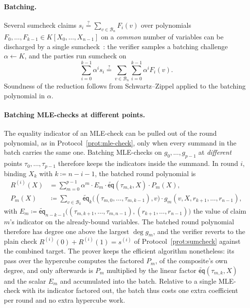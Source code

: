 \documentclass{article}
\theoremstyle{definition}
\newcommand*{\mle}{\widetilde}
\newcommand{\eq}{\mathsf{eq}}
\newcommand{\BB}{\mathcal{B}}
\begin{document}
\paragraph{Batching.}
Several sumcheck claims $s_i \stackrel{?}{=} \sum_{v \in \BB_n} F_i(v)$ over polynomials $F_0, \ldots, F_{k - 1} \in K[X_0, \ldots, X_{n - 1}]$ on a \emph{common} number of variables can be discharged by a single sumcheck~\cite{cryptoeprint:2017/305}: the verifier samples a batching challenge $\alpha \gets K$, and the parties run sumcheck on
\[
  \sum_{i = 0}^{k - 1} \alpha^i s_i \stackrel{?}{=} \sum_{v \in \BB_n} \sum_{i = 0}^{k - 1} \alpha^i F_i(v).
\]
Soundness of the reduction follows from Schwartz--Zippel applied to the batching polynomial in $\alpha$.

\paragraph{Batching MLE-checks at different points.}
\label{sec:batching-mle-checks}
The equality indicator of an MLE-check can be pulled out of the round polynomial, as in Protocol~\ref{prot:mle-check}, only when every summand in the batch carries the same one. Batching MLE-checks on $g_0, \ldots, g_{p - 1}$ at \emph{different} points $\tau_0, \ldots, \tau_{p - 1}$ therefore keeps the indicators inside the summand. In round $i$, binding $X_k$ with $k \coloneqq n - i - 1$, the batched round polynomial is
\begin{align*}
  R^{(i)}(X) &= \sum_{m = 0}^{p - 1} \alpha^m \cdot E_m \cdot \mle{\eq}(\tau_{m, k}, X) \cdot P_m(X), \\
  P_m(X) &\coloneqq \sum_{v \in \BB_k} \mle{\eq}_k\bigl( (\tau_{m, 0}, \ldots, \tau_{m, k - 1}), v \bigr) \cdot g_m(v, X, r_{k + 1}, \ldots, r_{n - 1}),
\end{align*}
with $E_m \coloneqq \mle{\eq}_{n - k - 1}\bigl( (\tau_{m, k + 1}, \ldots, \tau_{m, n - 1}), (r_{k + 1}, \ldots, r_{n - 1}) \bigr)$ the value of claim $m$'s indicator on the already-bound variables. The batched round polynomial therefore has degree one above the largest $\deg g_m$, and the verifier reverts to the plain check $R^{(i)}(0) + R^{(i)}(1) = s^{(i)}$ of Protocol~\ref{prot:sumcheck} against the combined target. The prover keeps the efficient algorithm nonetheless: its pass over the hypercube computes the factored $P_m$, of the composite's own degree, and only afterwards is $P_m$ multiplied by the linear factor $\mle{\eq}(\tau_{m, k}, X)$ and the scalar $E_m$ and accumulated into the batch. Relative to a single MLE-check with its indicator factored out, the batch thus costs one extra coefficient per round and no extra hypercube work.
\end{document}
